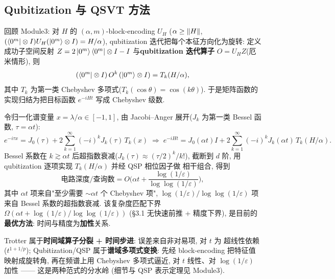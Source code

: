 \documentclass[utf8]{article} %
\numberwithin{equation}{section}   %
\newtheorem{Note}{\hskip 2em {\color{red} 注}}[subsection]
\begin{document}
\subsection{Qubitization 与 QSVT 方法}

回顾 Module3: 对 $H$ 的 $(\alpha, m)$-block-encoding $U_H$
($\alpha \ge \norm{H}$, $(\bra{0^m}\otimes I)U_H(\ket{0^m}\otimes I) = H/\alpha$),
qubitization 迭代把每个本征方向化为旋转: 定义成功子空间反射
$Z = 2\ket{0^m}\bra{0^m}\otimes I - I$ 与\textbf{qubitization 迭代算子}
$O = U_H Z$(厄米情形), 则
\begin{equation}
    (\bra{0^m}\otimes I)\,O^k\,(\ket{0^m}\otimes I) = T_k(H/\alpha),
\end{equation}
其中 $T_k$ 为第一类 Chebyshev 多项式($T_k(\cos\theta) = \cos(k\theta)$).
于是矩阵函数的实现归结为把目标函数 $e^{-iHt}$ 写成 Chebyshev 级数.

\begin{Note}
    令归一化谱变量 $x = \lambda/\alpha \in [-1,1]$, 由 Jacobi--Anger 展开($J_k$ 为第一类
    Bessel 函数, $\tau = \alpha t$):
    \begin{equation}
        e^{-i\tau x} = J_0(\tau) + 2\sum_{k=1}^{\infty}(-i)^k J_k(\tau)\,T_k(x)
        \;\Longrightarrow\;
        e^{-iHt} = J_0(\alpha t)I + 2\sum_{k=1}^{\infty}(-i)^k J_k(\alpha t)\,T_k(H/\alpha).
    \end{equation}
    Bessel 系数在 $k \gtrsim \alpha t$ 后超指数衰减($J_k(\tau) \approx (\tau/2)^k/k!$),
    截断到 $d$ 阶, 用 qubitization 逐项实现 $T_k(H/\alpha)$ 并经 QSP 相位因子做
    相干组合, 得到
    \begin{equation}
        \text{电路深度/查询数} = O\!\Big(\alpha t +
        \frac{\log(1/\varepsilon)}{\log\log(1/\varepsilon)}\Big),
    \end{equation}
    其中 $\alpha t$ 项来自"至少需要 $\sim\alpha t$ 个 Chebyshev 项",
    $\log(1/\varepsilon)/\log\log(1/\varepsilon)$ 项来自 Bessel 系数的超指数衰减.
    该复杂度匹配下界 $\Omega(\alpha t + \log(1/\varepsilon)/\log\log(1/\varepsilon))$
    (§3.1 无快速前推 + 精度下界), 是目前的\textbf{最优方法}: 时间与精度为\textbf{加性}关系.
\end{Note}

\begin{Note}
    Trotter 属于\textbf{时间域算子分裂 + 时间步进}: 误差来自非对易项, 对 $t$ 为
    超线性依赖($t^{1+1/p}$); Qubitization/QSP 属于\textbf{谱域多项式变换}:
    先经 block-encoding 把特征值映射成旋转角, 再在频谱上用 Chebyshev 多项式逼近,
    对 $t$ 线性、对 $\log(1/\varepsilon)$ 加性 —— 这是两种范式的分水岭
    (细节与 QSP 表示定理见 Module3).
\end{Note}
\end{document}
